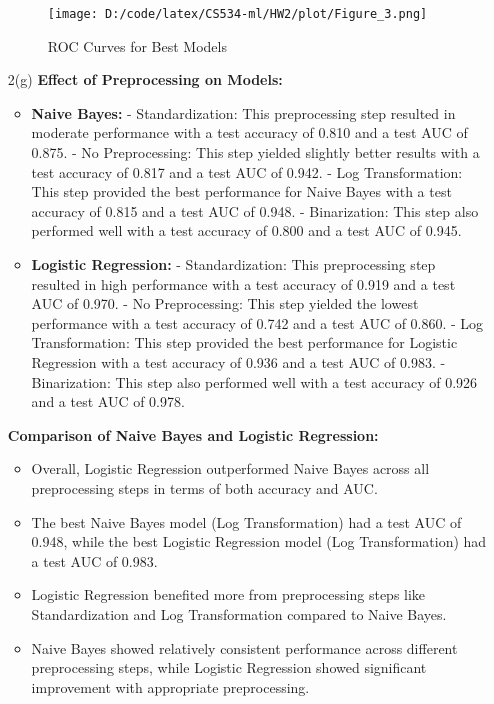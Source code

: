 \documentclass[10pt,letterpaper]{article}
\begin{document}
\begin{itemize}
                \begin{figure}[H]
                    \centering
                    \texttt{[image: D:/code/latex/CS534-ml/HW2/plot/Figure\_3.png]}
                    \caption{ROC Curves for Best Models}
                    \label{fig:best_roc}
                \end{figure} 
            \item[2(g)]
                \textbf{Effect of Preprocessing on Models:}
                \begin{itemize}
                    \item \textbf{Naive Bayes:} 
                        - Standardization: This preprocessing step resulted in moderate performance with a test accuracy of 0.810 and a test AUC of 0.875.
                        - No Preprocessing: This step yielded slightly better results with a test accuracy of 0.817 and a test AUC of 0.942.
                        - Log Transformation: This step provided the best performance for Naive Bayes with a test accuracy of 0.815 and a test AUC of 0.948.
                        - Binarization: This step also performed well with a test accuracy of 0.800 and a test AUC of 0.945.
                    \item \textbf{Logistic Regression:} 
                        - Standardization: This preprocessing step resulted in high performance with a test accuracy of 0.919 and a test AUC of 0.970.
                        - No Preprocessing: This step yielded the lowest performance with a test accuracy of 0.742 and a test AUC of 0.860.
                        - Log Transformation: This step provided the best performance for Logistic Regression with a test accuracy of 0.936 and a test AUC of 0.983.
                        - Binarization: This step also performed well with a test accuracy of 0.926 and a test AUC of 0.978.
                \end{itemize}
                
                \textbf{Comparison of Naive Bayes and Logistic Regression:}
                \begin{itemize}
                    \item Overall, Logistic Regression outperformed Naive Bayes across all preprocessing steps in terms of both accuracy and AUC.
                    \item The best Naive Bayes model (Log Transformation) had a test AUC of 0.948, while the best Logistic Regression model (Log Transformation) had a test AUC of 0.983.
                    \item Logistic Regression benefited more from preprocessing steps like Standardization and Log Transformation compared to Naive Bayes.
                    \item Naive Bayes showed relatively consistent performance across different preprocessing steps, while Logistic Regression showed significant improvement with appropriate preprocessing.
                \end{itemize}
        \end{itemize}
\end{document}

